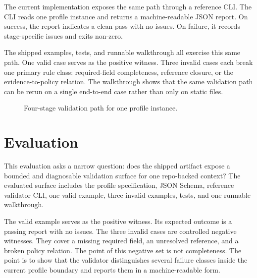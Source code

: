 \documentclass[conference]{IEEEtran}
\begin{document}
The current implementation exposes the same path through a reference CLI. The CLI reads one profile instance and returns a machine-readable JSON report. On success, the report indicates a clean pass with no issues. On failure, it records stage-specific issues and exits non-zero.

The shipped examples, tests, and runnable walkthrough all exercise this same path. One valid case serves as the positive witness. Three invalid cases each break one primary rule class: required-field completeness, reference closure, or the evidence-to-policy relation. The walkthrough shows that the same validation path can be rerun on a single end-to-end case rather than only on static files.

\begin{figure}[t]
\centering
{}
\caption{Four-stage validation path for one profile instance.}
\label{fig:validator}
\end{figure}

\section{Evaluation}

This evaluation asks a narrow question: does the shipped artifact expose a bounded and diagnosable validation surface for one repo-backed context? The evaluated surface includes the profile specification, JSON Schema, reference validator CLI, one valid example, three invalid examples, tests, and one runnable walkthrough.

The valid example serves as the positive witness. Its expected outcome is a passing report with no issues. The three invalid cases are controlled negative witnesses. They cover a missing required field, an unresolved reference, and a broken policy relation. The point of this negative set is not completeness. The point is to show that the validator distinguishes several failure classes inside the current profile boundary and reports them in a machine-readable form.
\end{document}
